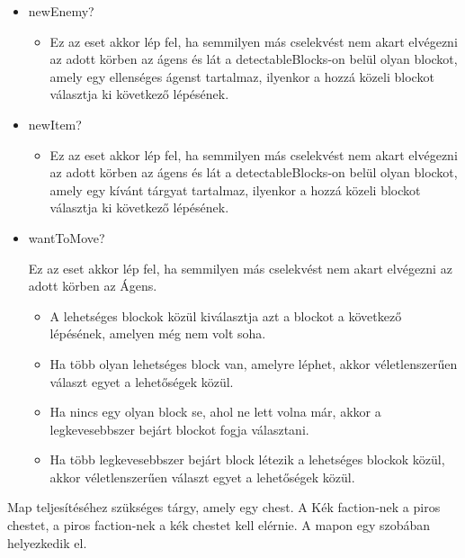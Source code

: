 \begin{itemize}
    \item newEnemy?

    \begin{itemize}
        \item Ez az eset akkor lép fel, ha semmilyen más cselekvést nem akart elvégezni az adott körben az ágens és lát a detectableBlocks-on belül olyan blockot,
            amely egy ellenséges ágenst tartalmaz, ilyenkor a hozzá közeli blockot választja ki következő lépésének.
    \end{itemize}

    \item newItem?

    \begin{itemize}
        \item Ez az eset akkor lép fel, ha semmilyen más cselekvést nem akart elvégezni az adott körben az ágens és lát a detectableBlocks-on belül olyan blockot,
        amely egy kívánt tárgyat tartalmaz, ilyenkor a hozzá közeli blockot választja ki következő lépésének.
    \end{itemize}

    \item wantToMove?
    
    Ez az eset akkor lép fel, ha semmilyen más cselekvést nem akart elvégezni az adott körben az Ágens.

    \begin{itemize}
        \item A lehetséges blockok közül kiválasztja azt a blockot a következő lépésének, amelyen még nem volt soha.
        \item Ha több olyan lehetséges block van, amelyre léphet, akkor véletlenszerűen választ egyet a lehetőségek közül.
        \item Ha nincs egy olyan block se, ahol ne lett volna már, akkor a legkevesebbszer bejárt blockot fogja választani.
        \item Ha több legkevesebbszer bejárt block létezik a lehetséges blockok közül, akkor véletlenszerűen választ egyet a lehetőségek közül.
    \end{itemize}
\end{itemize}


Map teljesítéséhez szükséges tárgy, amely egy chest. A Kék faction-nek a piros chestet, a piros faction-nek a kék chestet kell elérnie.
A mapon egy szobában helyezkedik el.



